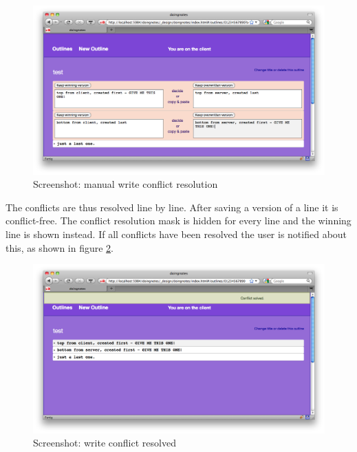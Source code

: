 \medskip
\begin{figure}[ht] 
  \begin{center}
  \includegraphics[width=\textwidth]{grafik/screenshot-write-conflict-solving} 
  \end{center}
  \caption{Screenshot: manual write conflict resolution}
  \label{fig:writeconflict-solving}
\end{figure}


The conflicts are thus resolved line by line. After saving a version of a line it is conflict-free. The conflict resolution mask is hidden for every line and the winning line is shown instead. If all conflicts have been resolved the user is notified about this, as shown in figure \ref{sec:piffpaff}.

\medskip
\begin{figure}[ht] 
  \begin{center}
  \includegraphics[width=\textwidth]{grafik/screenshot-write-conflict-solved} 
  \end{center}
  \caption{Screenshot: write conflict resolved}
  \label{sec:piffpaff} 
\end{figure}

